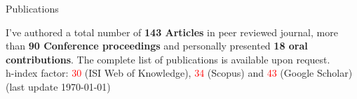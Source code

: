 \begin{cvblock}{Publications}
\end{cvblock}
I've authored a total number of \textbf{143 Articles} in peer reviewed journal,
more than \textbf{90 Conference proceedings} and personally presented \textbf{18 oral
contributions}. The complete list of publications is available upon request. \\
h-index factor: \textcolor{red}{30} (ISI Web of Knowledge),
\textcolor{red}{34} (Scopus) and \textcolor{red}{43} 
(Google Scholar) (last update \today)

